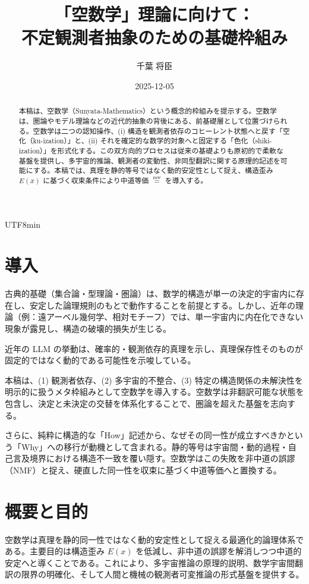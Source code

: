 \documentclass[11pt]{article}
\title{「空数学」理論に向けて：\\ 不定観測者抽象のための基礎枠組み} \author{千葉 将臣}
\date{2025-12-05}
\newcommand{\mweq}{\mathrel{\overset{\mathrm{mw}}{=}}}
\begin{document}
\begin{CJK}{UTF8}{min}
\let\bfseries\mdseries
\let\itshape\upshape
\maketitle

\begin{abstract}
本稿は、空数学（Sunyata-Mathematics）という概念的枠組みを提示する。空数学は、圏論やモデル理論などの近代的抽象の背後にある、前基礎層として位置づけられる。空数学は二つの認知操作、(i) 構造を観測者依存のコヒーレント状態へと戻す「空化（ku-ization）」と、(ii) それを確定的な数学的対象へと固定する「色化（shiki-ization）」を形式化する。この双方向的プロセスは従来の基礎よりも原初的で柔軟な基盤を提供し、多宇宙的推論、観測者の変動性、非同型翻訳に関する原理的記述を可能にする。本稿では、真理を静的等号ではなく動的安定性として捉え、構造歪み $E(x)$ に基づく収束条件により中道等価 $\mweq$ を導入する。
\end{abstract}

\section{導入}
古典的基礎（集合論・型理論・圏論）は、数学的構造が単一の決定的宇宙内に存在し、安定した論理規則のもとで動作することを前提とする。しかし、近年の理論（例：遠アーベル幾何学、相対モチーフ）では、単一宇宙内に内在化できない現象が露見し、構造の破壊的損失が生じる。

近年の LLM の挙動は、確率的・観測依存的真理を示し、真理保存性そのものが固定的ではなく動的である可能性を示唆している。

本稿は、(1) 観測者依存、(2) 多宇宙的不整合、(3) 特定の構造関係の未解決性を明示的に扱うメタ枠組みとして空数学を導入する。空数学は非翻訳可能な状態を包含し、決定と未決定の交替を体系化することで、圏論を超えた基盤を志向する。

さらに、純粋に構造的な「How」記述から、なぜその同一性が成立すべきかという「Why」への移行が動機として含まれる。静的等号は宇宙間・動的過程・自己言及境界における構造不一致を覆い隠す。空数学はこの失敗を非中道の誤謬（NMF）と捉え、硬直した同一性を収束に基づく中道等価へと置換する。

\section{概要と目的}
空数学は真理を静的同一性ではなく動的安定性として捉える最適化的論理体系である。主要目的は構造歪み $E(x)$ を低減し、非中道の誤謬を解消しつつ中道的安定へと導くことである。これにより、多宇宙推論の原理的説明、数学宇宙間翻訳の限界の明確化、そして人間と機械の観測者可変推論の形式基盤を提供する。


\end{CJK}
\end{document}
